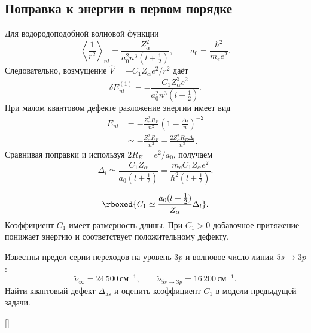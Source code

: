 \documentclass[../final.tex]{subfiles}
\begin{document}
\solution
\subsection*{Поправка к энергии в первом порядке}

Для водородоподобной волновой функции
\[
    \left\langle\frac1{r^2}\right\rangle_{nl}
    =\frac{Z_{\alpha}^2}{a_0^2n^3(l+\tfrac12)},\qquad
    a_0=\frac{\hbar^2}{m_e e^2}.
\]
Следовательно, возмущение $\hat V=-C_1Z_{\alpha}e^2/r^2$ даёт
\[
    \delta E_{nl}^{(1)}
    =-\frac{C_1Z_{\alpha}^3e^2}{a_0^2n^3(l+\tfrac12)}.
\]
При малом квантовом дефекте разложение энергии имеет вид
\begin{align*}
    E_{nl}
    &=-\frac{Z_{\alpha}^2R_E}{n^2}
      \left(1-\frac{\Delta_l}{n}\right)^{-2}\\
    &\simeq-\frac{Z_{\alpha}^2R_E}{n^2}
      -\frac{2Z_{\alpha}^2R_E\Delta_l}{n^3}.
\end{align*}
Сравнивая поправки и используя $2R_E=e^2/a_0$, получаем
\[
    \Delta_l\simeq\frac{C_1Z_{\alpha}}{a_0(l+\tfrac12)}
    =\frac{m_eC_1Z_{\alpha}e^2}{\hbar^2(l+\tfrac12)}.
\]

\answer
\[
    \rboxed{C_1\simeq\frac{a_0(l+\tfrac12)}{Z_{\alpha}}\Delta_l}.
\]
Коэффициент $C_1$ имеет размерность длины. При $C_1>0$ добавочное
притяжение понижает энергию и соответствует положительному дефекту.


\condition
Известны предел серии переходов на уровень $3p$
и волновое число линии $5s\to3p$:
\[
    \widetilde\nu_\infty=24\,500\,\text{см}^{-1},\qquad
    \widetilde\nu_{5s\to3p}=16\,200\,\text{см}^{-1}.
\]
Найти квантовый дефект $\Delta_{5s}$ и оценить коэффициент $C_1$
в модели предыдущей задачи.

\begin{rbox}[unbreakable,left=12pt,right=12pt,top=12pt,bottom=10pt]{[]}
\centering
{}
\end{rbox}
\end{document}
